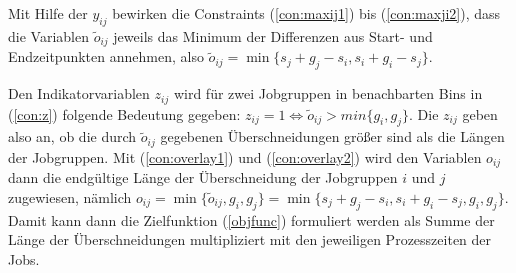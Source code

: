 \documentclass{article}
\begin{document}
Mit Hilfe der $y_{ij}$ bewirken die Constraints (\ref{con:maxij1}) bis
(\ref{con:maxji2}), dass die Variablen $\tilde{o}_{ij}$ jeweils das Minimum
der Differenzen aus Start- und Endzeitpunkten annehmen, also
$\tilde{o}_{ij}=\min\{s_j+g_j-s_i, s_i+g_i-s_j\}$.

Den Indikatorvariablen $z_{ij}$ wird für zwei Jobgruppen in benachbarten Bins
in (\ref{con:z}) folgende Bedeutung gegeben:
$z_{ij}=1 \iff \tilde{o}_{ij} > min\{g_i,g_j\}$. Die $z_{ij}$ geben also an, ob die
durch $\tilde{o}_{ij}$ gegebenen Überschneidungen größer sind als die Längen
der Jobgruppen. Mit (\ref{con:overlay1}) und (\ref{con:overlay2}) wird den
Variablen $o_{ij}$ dann die endgültige Länge der Überschneidung der Jobgruppen
$i$ und $j$ zugewiesen, nämlich 
$o_{ij} = \min\{\tilde{o}_{ij},g_i,g_j\} = \min\{s_j+g_j-s_i,s_i+g_i-s_j,g_i,g_j\}$.
Damit kann dann die Zielfunktion (\ref{objfunc}) formuliert werden als Summe
der Länge der Überschneidungen multipliziert mit den jeweiligen Prozesszeiten
der Jobs.
\end{document}

